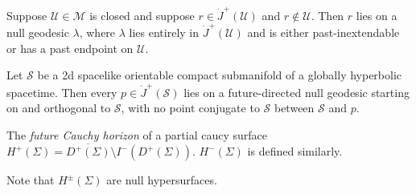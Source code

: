 \documentclass{jknotes}
\begin{document}
\begin{theorem}
    Suppose \(\mathcal{U}\in\mathcal{M}\) is closed and suppose \(r \in \dot{J}^+(\mathcal{U})\) and \(r \not\in \mathcal{U}\). Then \(r\) lies on a null geodesic \(\lambda\), where \(\lambda\) lies entirely in \(\dot{J}^+(\mathcal{U})\) and is either past-inextendable or has a past endpoint on \(\mathcal{U}\).
\end{theorem}
\begin{theorem}
    Let \(\mathcal{S}\) be a 2d spacelike orientable compact submanifold of a globally hyperbolic spacetime. Then every \(p \in \dot{J}^+(\mathcal{S})\) lies on a future-directed null geodesic starting on and orthogonal to \(\mathcal{S}\), with no point conjugate to \(\mathcal{S}\) between \(\mathcal{S}\) and \(p\).
    \label{alsoneeded}
\end{theorem}
\begin{defn}
    The \emph{future Cauchy horizon} of a partial caucy surface \(H^+(\Sigma)=\overline{D^+(\Sigma)}\setminus I^-(D^+(\Sigma))\). \(H^-(\Sigma)\) is defined similarly.
\end{defn}
Note that \(H^\pm(\Sigma)\) are null hypersurfaces.
\end{document}
